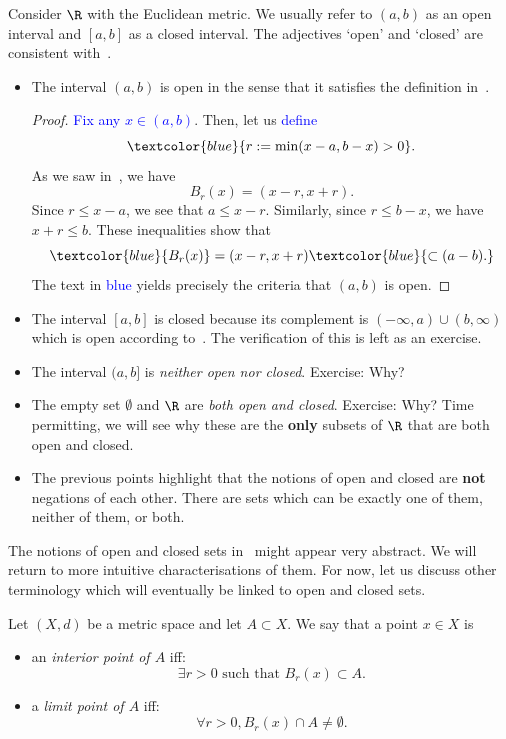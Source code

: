 \begin{eg}
	Consider $\R$ with the Euclidean metric. We usually refer to $(a,b)$ as an open interval and $[a,b]$ as a closed interval. The adjectives `open' and `closed' are consistent with~.
\begin{itemize}
	\item The interval $(a,b)$ is open in the sense that it satisfies the definition in~. 
	\begin{proof}
	\textcolor{blue}{Fix any $x \in (a,b)$}. Then, let us \textcolor{blue}{define}
	\[
	\textcolor{blue}{r:= \min (x-a,b-x)>0}.
	\]As we saw in~, we have
	\[
	B_r(x) = (x-r,x+r).
	\]
	Since $r \le x-a$, we see that $a \le x-r$. Similarly, since $r\le b-x$, we have $x+r \le b$. These inequalities show that
	\[
	\textcolor{blue}{B_r(x)} = (x-r,x+r)\textcolor{blue}{\subset (a-b).} 
	\]
	The text in \textcolor{blue}{blue} yields precisely the criteria that $(a,b)$ is open.
	\end{proof}
	\item The interval $[a,b]$ is closed because its complement is $(-\infty,a)\cup (b,\infty)$ which is open according to~. The verification of this is left as an exercise.
	\item The interval $(a,b]$ is \textit{neither open nor closed}. Exercise: Why?
	\item The empty set $\emptyset$ and $\R$ are \textit{both open and closed}. Exercise: Why? Time permitting, we will see why these are the \textbf{only} subsets of $\R$ that are both open and closed.
	\item The previous points highlight that the notions of open and closed are \textbf{not} negations of each other. There are sets which can be exactly one of them, neither of them, or both.
\end{itemize}
\end{eg}
The notions of open and closed sets in~ might appear very abstract. We will return to more intuitive characterisations of them. For now, let us discuss other terminology which will eventually be linked to open and closed sets.
\begin{defn}
	\label{defn:int_lim_pts}
Let $(X,d)$ be a metric space and let $A\subset X$. We say that a point $x\in X$ is
\begin{itemize}
	\item an \textit{interior point of $A$} iff:
	\[
	\exists r>0\text{ such that }B_r(x) \subset A.
	\]
	\item a \textit{limit point of $A$} iff:
	\[
	\forall r>0, B_r(x) \cap A \neq \emptyset.
	\]
\end{itemize}
\end{defn}
